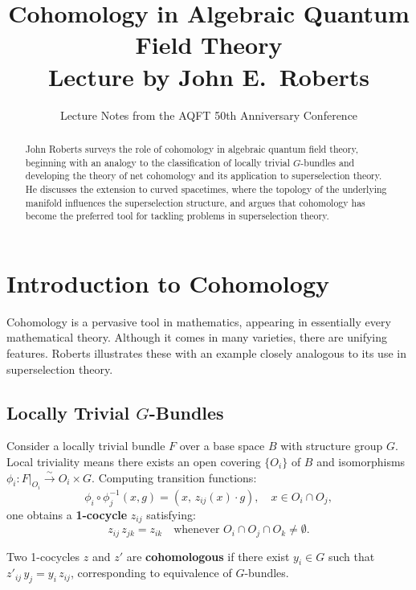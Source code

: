 \documentclass[11pt,a4paper]{article}
\title{\textbf{Cohomology in Algebraic Quantum Field Theory}\\[6pt]
\large Lecture by John E.\ Roberts}
\author{Lecture Notes from the AQFT 50th Anniversary Conference}
\date{}
\begin{document}
\maketitle

\begin{abstract}
John Roberts surveys the role of cohomology in algebraic quantum field theory,
beginning with an analogy to the classification of locally trivial $G$-bundles
and developing the theory of net cohomology and its application to superselection
theory. He discusses the extension to curved spacetimes, where the topology of
the underlying manifold influences the superselection structure, and argues that
cohomology has become the preferred tool for tackling problems in superselection
theory.
\end{abstract}

\tableofcontents

\section{Introduction to Cohomology}

Cohomology is a pervasive tool in mathematics, appearing in essentially every
mathematical theory. Although it comes in many varieties, there are unifying
features. Roberts illustrates these with an example closely analogous to its
use in superselection theory.

\subsection{Locally Trivial $G$-Bundles}

Consider a locally trivial bundle $F$ over a base space $B$ with structure
group $G$. Local triviality means there exists an open covering $\{O_i\}$
of $B$ and isomorphisms $\phi_i: F|_{O_i} \xrightarrow{\sim} O_i \times G$.
Computing transition functions:
\begin{equation}
  \phi_i \circ \phi_j^{-1}(x, g) = (x,\, z_{ij}(x)\cdot g),
  \quad x \in O_i \cap O_j,
\end{equation}
one obtains a \textbf{1-cocycle} $z_{ij}$ satisfying:
\begin{equation}
  z_{ij}\, z_{jk} = z_{ik}
  \quad\text{whenever } O_i \cap O_j \cap O_k \neq \emptyset.
\end{equation}

Two 1-cocycles $z$ and $z'$ are \textbf{cohomologous} if there exist
$y_i \in G$ such that $z'_{ij}\, y_j = y_i\, z_{ij}$, corresponding
to equivalence of $G$-bundles.
\end{document}
